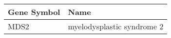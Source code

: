 \begin{tabular}{ll}
\toprule
Gene Symbol &                       Name \\
\midrule
       MDS2 & myelodysplastic syndrome 2 \\
\bottomrule
\end{tabular}
